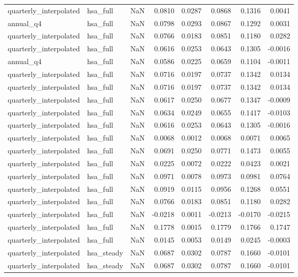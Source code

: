 \begin{tabular}{llrrrrrr}
quarterly\_interpolated & hsa\_full & NaN & 0.0810 & 0.0287 & 0.0868 & 0.1316 & 0.0041 \\
annual\_q4 & hsa\_full & NaN & 0.0798 & 0.0293 & 0.0867 & 0.1292 & 0.0031 \\
quarterly\_interpolated & hsa\_full & NaN & 0.0766 & 0.0183 & 0.0851 & 0.1180 & 0.0282 \\
quarterly\_interpolated & hsa\_full & NaN & 0.0616 & 0.0253 & 0.0643 & 0.1305 & -0.0016 \\
annual\_q4 & hsa\_full & NaN & 0.0586 & 0.0225 & 0.0659 & 0.1104 & -0.0011 \\
quarterly\_interpolated & hsa\_full & NaN & 0.0716 & 0.0197 & 0.0737 & 0.1342 & 0.0134 \\
quarterly\_interpolated & hsa\_full & NaN & 0.0716 & 0.0197 & 0.0737 & 0.1342 & 0.0134 \\
quarterly\_interpolated & hsa\_full & NaN & 0.0617 & 0.0250 & 0.0677 & 0.1347 & -0.0009 \\
quarterly\_interpolated & hsa\_full & NaN & 0.0634 & 0.0249 & 0.0655 & 0.1417 & -0.0103 \\
quarterly\_interpolated & hsa\_full & NaN & 0.0616 & 0.0253 & 0.0643 & 0.1305 & -0.0016 \\
quarterly\_interpolated & hsa\_full & NaN & 0.0068 & 0.0012 & 0.0068 & 0.0071 & 0.0065 \\
quarterly\_interpolated & hsa\_full & NaN & 0.0691 & 0.0250 & 0.0771 & 0.1473 & 0.0055 \\
quarterly\_interpolated & hsa\_full & NaN & 0.0225 & 0.0072 & 0.0222 & 0.0423 & 0.0021 \\
quarterly\_interpolated & hsa\_full & NaN & 0.0971 & 0.0078 & 0.0973 & 0.0981 & 0.0764 \\
quarterly\_interpolated & hsa\_full & NaN & 0.0919 & 0.0115 & 0.0956 & 0.1268 & 0.0551 \\
quarterly\_interpolated & hsa\_full & NaN & 0.0766 & 0.0183 & 0.0851 & 0.1180 & 0.0282 \\
quarterly\_interpolated & hsa\_full & NaN & -0.0218 & 0.0011 & -0.0213 & -0.0170 & -0.0215 \\
quarterly\_interpolated & hsa\_full & NaN & 0.1778 & 0.0015 & 0.1779 & 0.1766 & 0.1747 \\
quarterly\_interpolated & hsa\_full & NaN & 0.0145 & 0.0053 & 0.0149 & 0.0245 & -0.0003 \\
quarterly\_interpolated & hsa\_steady & NaN & 0.0687 & 0.0302 & 0.0787 & 0.1660 & -0.0101 \\
quarterly\_interpolated & hsa\_steady & NaN & 0.0687 & 0.0302 & 0.0787 & 0.1660 & -0.0101 \\

\end{tabular}
